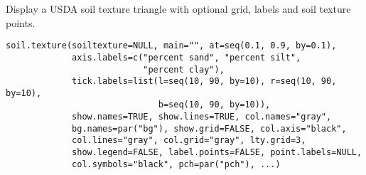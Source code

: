 \begin{Description}\relax
Display a USDA soil texture triangle with optional grid, labels and
soil texture points.
\end{Description}
\begin{Usage}
\begin{verbatim}
soil.texture(soiltexture=NULL, main="", at=seq(0.1, 0.9, by=0.1),
             axis.labels=c("percent sand", "percent silt",
                           "percent clay"),
             tick.labels=list(l=seq(10, 90, by=10), r=seq(10, 90, by=10),
                              b=seq(10, 90, by=10)),
             show.names=TRUE, show.lines=TRUE, col.names="gray",
             bg.names=par("bg"), show.grid=FALSE, col.axis="black",
             col.lines="gray", col.grid="gray", lty.grid=3,
             show.legend=FALSE, label.points=FALSE, point.labels=NULL,
             col.symbols="black", pch=par("pch"), ...)
\end{verbatim}
\end{Usage}
